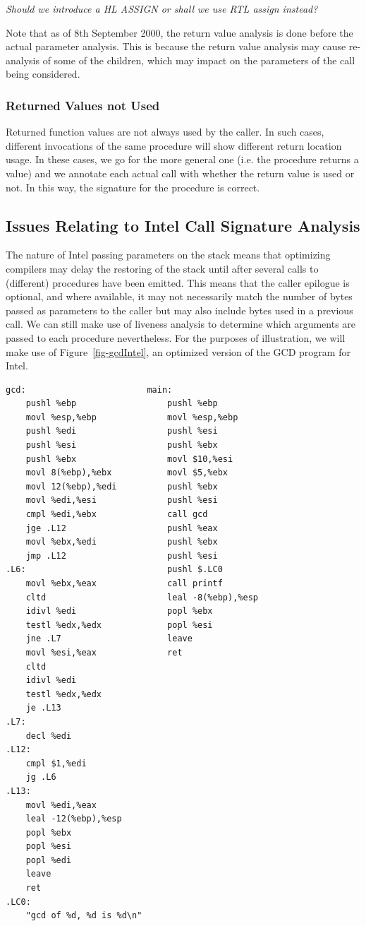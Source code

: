 \emph{Should we introduce a HL ASSIGN or shall we use RTL assign 
instead?}

Note that as of 8th September 2000, the return value analysis is done before
the actual parameter analysis. This is because the return value analysis
may cause re-analysis of some of the children, which may impact on the
parameters of the call being considered.

\subsubsection*{Returned Values not Used}
Returned function values are not always used by the caller.  In such
cases, different invocations of the same procedure will show different
return location usage.  In these cases, we go for the more general 
one (i.e. the procedure returns a value) and we annotate each actual 
call with whether the return value is used or not.  In this way, the
signature for the procedure is correct. 


\subsection{Issues Relating to Intel Call Signature Analysis}
\label{sec-callsigIntel}
The nature of Intel passing parameters on the stack means that
optimizing compilers may delay the restoring of the stack until 
after several calls to (different) procedures have been emitted. 
This means that the caller epilogue is optional, and where 
available, it may not necessarily match the number of bytes 
passed as parameters to the caller but may also include bytes
used in a previous call.  We can still make use of liveness 
analysis to determine which arguments are passed to each procedure 
nevertheless.
For the purposes of illustration, we will make use of 
Figure~\ref{fig-gcdIntel}, an optimized version of the GCD program for Intel.

\centerfigbegin
{\small
\begin{verbatim}
gcd:                        main:
    pushl %ebp                  pushl %ebp
    movl %esp,%ebp              movl %esp,%ebp
    pushl %edi                  pushl %esi
    pushl %esi                  pushl %ebx
    pushl %ebx                  movl $10,%esi
    movl 8(%ebp),%ebx           movl $5,%ebx
    movl 12(%ebp),%edi          pushl %ebx
    movl %edi,%esi              pushl %esi
    cmpl %edi,%ebx              call gcd
    jge .L12                    pushl %eax
    movl %ebx,%edi              pushl %ebx
    jmp .L12                    pushl %esi
.L6:                            pushl $.LC0
    movl %ebx,%eax              call printf
    cltd                        leal -8(%ebp),%esp
    idivl %edi                  popl %ebx
    testl %edx,%edx             popl %esi
    jne .L7                     leave
    movl %esi,%eax              ret
    cltd
    idivl %edi
    testl %edx,%edx
    je .L13
.L7:
    decl %edi
.L12:
    cmpl $1,%edi
    jg .L6
.L13:
    movl %edi,%eax
    leal -12(%ebp),%esp
    popl %ebx
    popl %esi
    popl %edi
    leave
    ret  
.LC0:
    "gcd of %d, %d is %d\n"
\end{verbatim}
}

